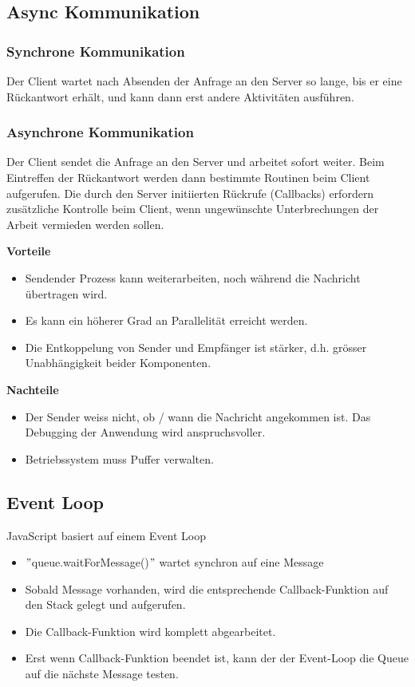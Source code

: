 \subsection{Async Kommunikation}
\subsubsection{Synchrone Kommunikation}
Der Client wartet nach Absenden der Anfrage an den Server so lange, bis er eine Rückantwort erhält, und kann dann erst andere Aktivitäten ausführen.
\subsubsection{Asynchrone Kommunikation} 
Der Client sendet die Anfrage an den Server und arbeitet sofort weiter. Beim Eintreffen der Rückantwort werden dann bestimmte Routinen beim Client aufgerufen.
Die durch den Server initiierten Rückrufe (Callbacks) erfordern zusätzliche Kontrolle beim Client, wenn ungewünschte Unterbrechungen der Arbeit vermieden werden sollen.

\textbf{Vorteile}
\begin{itemize}
	\item Sendender Prozess kann weiterarbeiten, noch während die Nachricht übertragen wird.
	\item Es kann ein höherer Grad an Parallelität erreicht werden.
	\item Die Entkoppelung von Sender und Empfänger ist stärker, d.h. grösser Unabhängigkeit beider Komponenten.	
\end{itemize}

\textbf{Nachteile}
\begin{itemize}
	\item Der Sender weiss nicht, ob / wann die Nachricht angekommen ist. Das Debugging der Anwendung wird anspruchsvoller.
	\item Betriebssystem muss Puffer verwalten.
\end{itemize}

\subsection{Event Loop}

JavaScript basiert auf einem Event Loop
\begin{itemize}
	\item $"$queue.waitForMessage()$"$ wartet synchron auf eine Message
	\item Sobald Message vorhanden, wird die entsprechende Callback-Funktion auf den Stack gelegt und aufgerufen.
	\item Die Callback-Funktion wird komplett abgearbeitet.
	\item Erst wenn Callback-Funktion beendet ist, kann der der Event-Loop die Queue auf die nächste Message testen.
\end{itemize}

